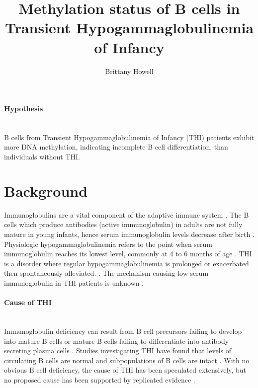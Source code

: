 \documentclass[12pt]{article}
\title{Methylation status of B cells in Transient Hypogammaglobulinemia of Infancy}
\date{}
\author{Brittany Howell}
\begin{document}
	\maketitle
	
	\paragraph{Hypothesis}
	~\\
	B cells from Transient Hypogammaglobulinemia of Infancy (THI) patients exhibit more DNA methylation, indicating incomplete B cell differentiation, than individuals without THI.
	
	\section{Background}
	
		Immunoglobulins are a vital component of the adaptive immune system \citep{Simon15}.  
		The B cells which produce antibodies (active immunoglobulin) in adults are not fully mature in young infants, hence serum immunoglobulin levels decrease after birth \citep{Martin10,Rechavi15,Stiemh80}. 
		Physiologic hypogammaglobulinemia refers to the point when serum immunoglobulin reaches its lowest level, commonly at 4 to 6 months of age \citep{Dressler89}. 
		THI is a disorder where regular hypogammaglobulinemia is prolonged or exacerbated then spontaneously alleviated. \citep{Stiemh80,Dressler89,AlHerz14,Gitlin56,AlHerz11,Rosen66,McGeady87, Dalal98,Tiller78,Buckley83}.
		The mechanism causing low serum immunoglobulin in THI patients is unknown \citep{AlHerz14}. 

	
		\paragraph{Cause of THI} 
			~\\
			Immunoglobulin deficiency can result from B cell precursors failing to develop into mature B cells or mature B cells failing to differentiate into antibody secreting plasma cells \citep{Fiorilli86}. 
			Studies investigating THI have found that levels of circulating B cells are normal and subpopulations of B cells are intact \citep{Tiller78,Stiemh80,Siegel81,Buckley83,Fiorilli86,Dressler89}.
			With no obvious B cell deficiency, the cause of THI has been speculated extensively, but no proposed cause has been supported by replicated evidence \citep{Fudenberg64,Rosen66,Nathenson71,Willenbockel60,Soothill68,Tiller78,Fiorilli86,Ovadia14,Siegel81,McGeady87}.
			
\end{document}
